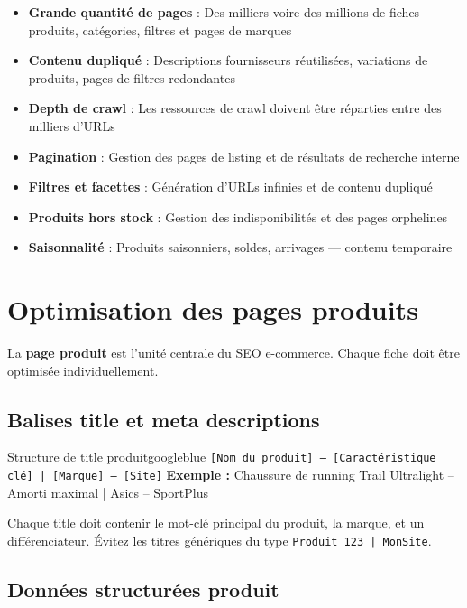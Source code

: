 \documentclass[12pt,a4paper,twoside]{report}
\newcommand{\keyword}[1]{\textbf{\textcolor{googleblue}{#1}}}
\begin{document}
\begin{itemize}
    \item \textbf{Grande quantité de pages} : Des milliers voire des millions de fiches produits, catégories, filtres et pages de marques
    \item \textbf{Contenu dupliqué} : Descriptions fournisseurs réutilisées, variations de produits, pages de filtres redondantes
    \item \textbf{Depth de crawl} : Les ressources de crawl doivent être réparties entre des milliers d'URLs
    \item \textbf{Pagination} : Gestion des pages de listing et de résultats de recherche interne
    \item \textbf{Filtres et facettes} : Génération d'URLs infinies et de contenu dupliqué
    \item \textbf{Produits hors stock} : Gestion des indisponibilités et des pages orphelines
    \item \textbf{Saisonnalité} : Produits saisonniers, soldes, arrivages --- contenu temporaire
\end{itemize}

\section{Optimisation des pages produits}

La \keyword{page produit} est l'unité centrale du SEO e-commerce. Chaque fiche doit être optimisée individuellement.

\subsection{Balises title et meta descriptions}

\begin{mybox}{Structure de title produit}{googleblue}
\texttt{[Nom du produit] -- [Caractéristique clé] | [Marque] -- [Site]}
\textbf{Exemple :} Chaussure de running Trail Ultralight -- Amorti maximal | Asics -- SportPlus
\end{mybox}

Chaque title doit contenir le mot-clé principal du produit, la marque, et un différenciateur. Évitez les titres génériques du type \texttt{Produit 123 | MonSite}.

\subsection{Données structurées produit}
\end{document}
